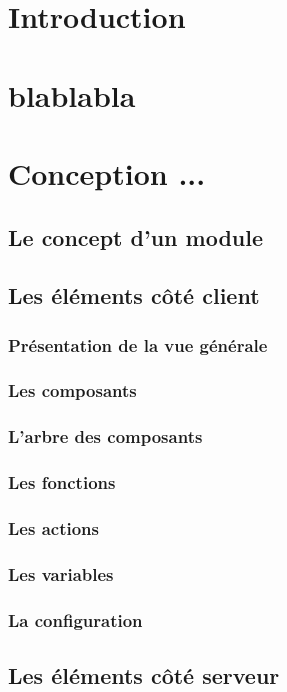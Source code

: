\documentclass[a4paper,12pt]{article}
\begin{document}
\section{Introduction}

\section{blablabla}

\section{Conception ...}
\subsection{Le concept d'un module}
\subsection{Les éléments côté client}
\subsubsection{Présentation de la vue générale}
\subsubsection{ Les composants} 
\subsubsection{ L'arbre des composants}
\subsubsection{ Les fonctions}
\subsubsection{ Les actions}
\subsubsection{ Les variables}
\subsubsection{ La configuration}

\subsection{Les éléments côté serveur}
\end{document}

